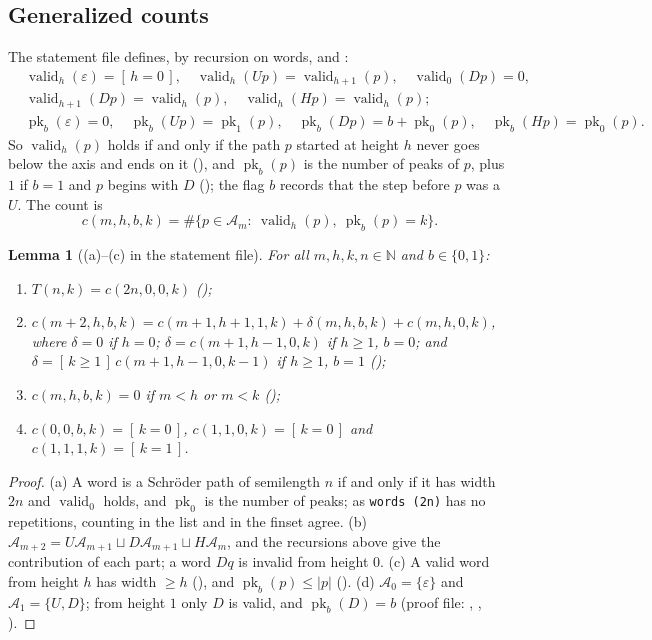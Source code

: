 \documentclass[11pt]{amsart}
\theoremstyle{plain}
\newtheorem{lemma}[theorem]{Lemma}
\theoremstyle{definition}
\newcommand{\N}{\mathbb{N}}
\newcommand{\Av}{\mathcal{A}}
\newcommand{\ib}[1]{[\,#1\,]}
\begin{document}
\subsection{Generalized counts}
The statement file defines, by recursion on words,  and :
\[
\begin{aligned}
&\operatorname{valid}_h(\varepsilon)=\ib{h=0},\quad \operatorname{valid}_h(Up)=\operatorname{valid}_{h+1}(p),\quad \operatorname{valid}_0(Dp)=0,\\
&\operatorname{valid}_{h+1}(Dp)=\operatorname{valid}_h(p),\quad \operatorname{valid}_h(Hp)=\operatorname{valid}_h(p);\\
&\operatorname{pk}_b(\varepsilon)=0,\quad \operatorname{pk}_b(Up)=\operatorname{pk}_1(p),\quad \operatorname{pk}_b(Dp)=b+\operatorname{pk}_0(p),\quad \operatorname{pk}_b(Hp)=\operatorname{pk}_0(p).
\end{aligned}
\]
So $\operatorname{valid}_h(p)$ holds if and only if the path $p$ started at height $h$ never goes below the axis and ends on it (), and $\operatorname{pk}_b(p)$ is the number of peaks of $p$, plus $1$ if $b=1$ and $p$ begins with $D$ (); the flag $b$ records that the step before $p$ was a $U$. The count  is
\[
  c(m,h,b,k)=\#\{p\in\Av_m:\ \operatorname{valid}_h(p),\ \operatorname{pk}_b(p)=k\}.
\]

\begin{lemma}[(a)--(c) in the statement file]\label{lem:cnt}
For all $m,h,k,n\in\N$ and $b\in\{0,1\}$:
\begin{enumerate}
\item[(a)] $T(n,k)=c(2n,0,0,k)$ \quad();
\item[(b)] $c(m+2,h,b,k)=c(m+1,h+1,1,k)+\delta(m,h,b,k)+c(m,h,0,k)$, where $\delta=0$ if $h=0$; $\delta=c(m+1,h-1,0,k)$ if $h\ge1$, $b=0$; and $\delta=\ib{k\ge1}\,c(m+1,h-1,0,k-1)$ if $h\ge1$, $b=1$ \quad();
\item[(c)] $c(m,h,b,k)=0$ if $m<h$ or $m<k$ \quad();
\item[(d)] $c(0,0,b,k)=\ib{k=0}$, $c(1,1,0,k)=\ib{k=0}$ and $c(1,1,1,k)=\ib{k=1}$.
\end{enumerate}
\end{lemma}

\begin{proof}
(a) A word is a Schr\"oder path of semilength $n$ if and only if it has width $2n$ and $\operatorname{valid}_0$ holds, and $\operatorname{pk}_0$ is the number of peaks; as \texttt{words (2n)} has no repetitions, counting in the list and in the finset agree.
(b) $\Av_{m+2}=U\Av_{m+1}\sqcup D\Av_{m+1}\sqcup H\Av_m$, and the recursions above give the contribution of each part; a word $Dq$ is invalid from height $0$.
(c) A valid word from height $h$ has width $\ge h$ (), and $\operatorname{pk}_b(p)\le|p|$ ().
(d) $\Av_0=\{\varepsilon\}$ and $\Av_1=\{U,D\}$; from height $1$ only $D$ is valid, and $\operatorname{pk}_b(D)=b$ (proof file: , , ).
\end{proof}
\end{document}

